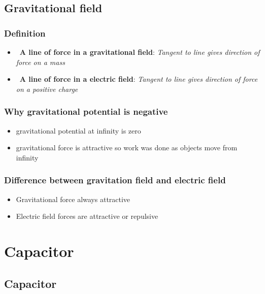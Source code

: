 \documentclass[a4paper,9pt]{scrartcl}
\begin{document}
    \subsection{Gravitational field}

    \subsubsection{Definition}

    \begin{itemize}
        \item~\textbf{A line of force in a gravitational field}: \textit{Tangent to line gives direction of force on a mass}
        \item~\textbf{A line of force in a electric field}: \textit{Tangent to line gives direction of force on a positive charge}
    \end{itemize}

    \subsubsection{Why gravitational potential is negative}
    \begin{itemize}
        \item gravitational potential at infinity is zero
        \item gravitational force is attractive so work was done as objects move from infinity
    \end{itemize}

    \subsubsection{Difference between gravitation field and electric field}
    \begin{itemize}
        \item Gravitational force always attractive
        \item Electric field forces are attractive or repulsive
    \end{itemize}


    \section{Capacitor}

    \subsection{Capacitor}
\end{document}
